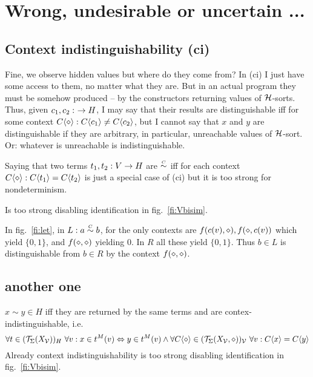 \documentclass[10pt]{article}
\newcommand{\simC}{\by\sim C}
\begin{document}
\section{Wrong, undesirable or uncertain ...}
\subsection{Context indistinguishability (ci)}
\begin{enum}
\item
Fine, we observe hidden values but where do they come from? In (ci)
I just have some access to them, no matter what they are. But in an actual program
they must be somehow produced -- by the constructors returning values of ${\cal H}$-sorts.
Thus, given $c_1,c_2:\ \rightarrow H$, I may say that their results are distinguishable
iff for some context $C\langle\diamond\rangle:C\langle c_1\rangle\not=C\langle c_2\rangle$, but I cannot say that 
$x$ and $y$ are distinguishable if they are arbitrary, in particular, unreachable
values of ${\cal H}$-sort. Or: whatever is unreachable is indistinguishable.

Saying that two terms $t_1,t_2:V\rightarrow H$ are $\simC$ iff for each context $C\langle\diamond\rangle:
C\langle t_1\rangle=C\langle t_2\rangle$ is just a special case of (ci) but it is too strong for
nondeterminism.
\item
Is too strong disabling identification in fig.~\ref{fi:Vbisim}.
\item
In fig.~\ref{fi:let}, in $L:a\simC b$, for the only contexts are $f(c(v),\diamond),
f(\diamond,c(v))$ which yield $\{0,1\}$, and $f(\diamond,\diamond)$ yielding $0$.
In $R$ all these yield $\{0,1\}$. Thus $b\in L$ is distinguishable from $b\in R$
by the context $f(\diamond,\diamond)$.
\end{enum}
%
\subsection{another one}
$x\sim y\in H$ iff they are returned by the same terms and are 
contex-indistinguishable, i.e. 
\[\forall t\in({\cal T}_{\Sigma}(X_{{\cal V}}))_H\ \forall v : x\in t^M(v)\Leftrightarrow y\in t^M(v)
\land
\forall C\langle\diamond\rangle\in({\cal T}_{\Sigma}(X_{{\cal V}},\diamond))_{\cal V}\ \forall v: C\langle x\rangle=C\langle y\rangle
\]
Already context indistinguishability is too strong disabling identification 
in fig.~\ref{fi:Vbisim}.
\end{document}
